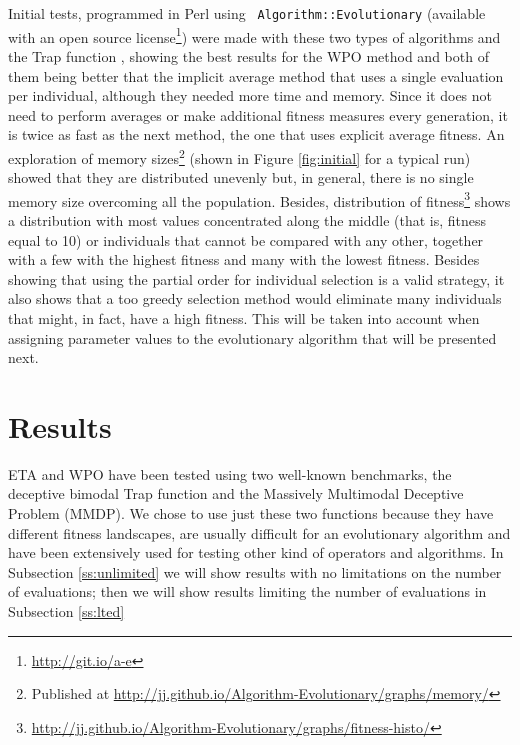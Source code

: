 \documentclass{llncs}
\begin{document}
\sloppypar Initial tests, programmed in Perl using {\tt
  Algorithm::Evolutionary} \cite{ae09} (available with an open %
source license\footnote{\url{http://git.io/a-e}}) were made with these two types of algorithms and the
Trap function \cite{wilcoxon:ga}, showing the best results for the WPO
method and both of them being better that
the implicit average method that uses a single evaluation per
individual, although they needed more time and memory. Since it does not need to perform averages or make
additional fitness measures every generation, it is twice as fast as
the next method, the one that uses explicit average fitness. An
exploration of memory sizes\footnote{Published at \url{http://jj.github.io/Algorithm-Evolutionary/graphs/memory/} } %
(shown in Figure \ref{fig:initial} for a
typical run) showed that they are distributed unevenly but, in general, there is no single memory size
overcoming all the population. Besides, distribution of fitness\footnote{\url{http://jj.github.io/Algorithm-Evolutionary/graphs/fitness-histo/}} shows a
distribution with most values concentrated along the middle (that is,
fitness equal to 10) or individuals that cannot be compared with any
other,
 together with a few with the highest fitness and many with the
lowest fitness. Besides showing that using the partial order for individual selection 
is a valid strategy, it also shows that a too greedy selection method would
eliminate many individuals that might, in fact, have a high fitness. This
will be taken into account when assigning parameter values to the
evolutionary algorithm that will be presented next.



\section{Results}
\label{sec:res}

ETA and WPO have been tested using two well-known benchmarks, the deceptive bimodal Trap \cite{deb1992analyzing}
function and the Massively Multimodal Deceptive Problem \cite{goldberg92massive} (MMDP). 
We chose to use just these two functions 
because they have different fitness landscapes, are usually difficult
for an evolutionary algorithm and have been extensively used for
testing other kind of operators and algorithms. In Subsection
\ref{ss:unlimited} we will show results with no limitations on the
number of evaluations; then we will show results limiting the number
of evaluations in Subsection \ref{ss:lted}
\end{document}
